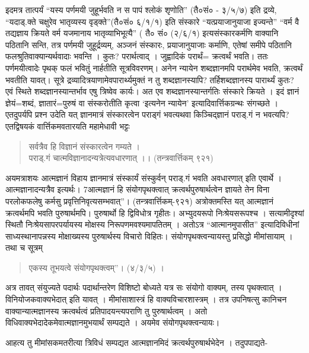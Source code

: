 इदमत्र तात्पर्यं  “यस्य पर्णमयी जुहूर्भवति न स पापं श्लोकं शृणोति” (तै०सं० - ३/५/७) इति द्रव्ये, “यदाड्.क्ते चक्षुरेव भातृव्यस्य वृड्क्ते”(तै०सं० ६/­१/१) इति संस्कारे “यत्प्रयाजानुयाजा इज्यन्ते” “वर्म वै तद्यज्ञाय क्रियते वर्म यजमानाय भातृव्याभिभूत्यै” ( तै० सं० (२/६/१) इत्यसंस्कारकर्मणि वाक्यानि पठितानि सन्ति, तत्र पर्णमयी जुहूर्द्रव्यम्, अञ्जनं संस्कारः, प्रयाजानुयाजाः कर्माणि, एतेषां समीपे पठितानि फलश्रुतिवाक्यान्यर्थवादाः भवन्ति । कुतः? परार्थत्वाद् । जुह्वादिकं परार्थं= क्रत्वर्थं भवति। ततः पर्णमयीत्वादेः पृथक् फलं भवितुं नार्हतीति सूत्रविवरणम्। अनेन न्यायेन शब्दज्ञानमपि परार्थमेव भवति, क्रत्वर्थं भवतीति यावत्। सूत्रे द्रव्यादित्रयाणामेवपारार्थ्यमुक्तं न तु शब्दज्ञानस्यापि? तर्हिशब्दज्ञानस्य पारार्थ्यं कुतः? एवं स्थिते शब्दज्ञानस्यान्तर्भाव एषु त्रिष्वेव कार्यः। अत एव शब्दज्ञानस्यान्तर्गतिः संस्कारे क्रियते । इदं ज्ञानं ज्ञेयं=शब्दं, ज्ञातारं=पुरुषं वा संस्करोतीति कृत्वा ‘इत्यनेन न्यायेन’ इत्यादिवार्त्तिकग्रन्थः संगच्छते । एतदुपर्यपि प्रश्न उदेति यत् ज्ञानमात्रं संस्कारत्वेन पराड्गं भवत्यथवा किञ्चिद्ज्ञानं पराड्.गं न भवत्यपि? एतद्विषयकं वार्त्तिकमवतारयति महामेधावी भट्टः 
\begin{verse}
सर्वत्रैव हि विज्ञानं संस्कारत्वेन गम्यते ।\\
पराड्.गं चात्मविज्ञानादन्यत्रेत्यवधारणात् ।। (तन्त्रवार्त्तिकम् ९२१)
\end{verse}
अयमत्राशयः  आत्मज्ञानं विहाय ज्ञानमात्रं संस्कार्यं संस्कुर्वन् पराड्.गं भवति अवधारणात् इति एवार्थे । आत्मज्ञानादन्यत्रैव इत्यर्थः। 7आत्मज्ञानं हि संयोगपृथक्त्वात् क्रत्वर्थपुरुषार्थत्वेन ज्ञायते तेन विना परलोकफलेषु कर्मसु प्रवृत्तिनिवृत्यसम्भवात्”। (तन्त्रवार्त्तिकम्-९२१) अत्रोक्तमस्ति यत् आत्मज्ञानं क्रत्वर्थमपि भवति पुरुषार्थमपि। पुरुषार्थो हि द्विविधोत्र गृहीतः। अभ्युदयरूपो निःश्रेयसरूपश्च । सत्यामीदृश्यां स्थितौ निःश्रेयसापरपर्यायस्य मोक्षस्य निरूपणमवश्यमापतितम् । अतोऽत्र “आत्मानमुपासीत” इत्यादिविधीनां साध्यस्थानापन्नस्य मोक्षाख्यस्य पुरुषार्थस्य विचारो विहितः। संयोगपृथक्त्वन्यायस्तु प्रसिद्धो मीमांसायाम् । तथा च सूत्रम्  
\begin{verse}
एकस्य तूभयत्वे संयोगपृथक्त्वम्”। (४/३/५) । 
\end{verse}
अत्र तावत् संयुज्यते पदार्थः पदार्थान्तरेण विशिष्टो बोध्यते यत्र सः संयोगो वाक्यम्, तस्य पृथक्त्वात् । विनियोजकवाक्यभेदात् इति यावत् । मीमांसाशास्त्रं हि वाक्यविचारशास्त्रम् । तत्र उपनिषत्सु कानिचन वाक्यान्यात्मज्ञानस्य क्रत्वर्थत्वं प्रतिपादयन्त्यपराणि तु पुरुषार्थत्वम् । अतो विधिवाक्यभेदादेकमेवात्मज्ञानमुभयार्थं सम्पद्यते । अयमेव संयोगपृथक्त्वन्यायः।

आहत्य तु मीमांसकमतरीत्या त्रिविधं सम्पद्यत आत्मज्ञानमिदं क्रत्वर्थपुरुषार्थभेदेन । तदुपपाद्यते-


